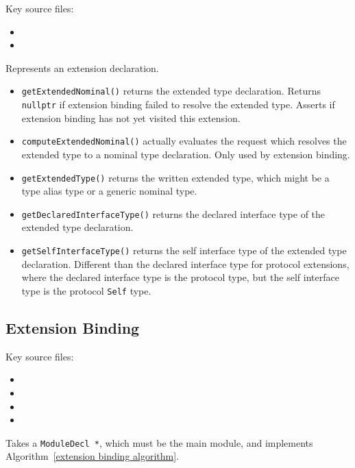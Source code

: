 \documentclass[../generics]{subfiles}
\begin{document}
Key source files:
\begin{itemize}
\item {}
\item {}
\end{itemize}

%
Represents an extension declaration.
\begin{itemize}
\item \texttt{getExtendedNominal()} returns the extended type declaration. Returns \verb|nullptr| if extension binding failed to resolve the extended type. Asserts if extension binding has not yet visited this extension.
\item \texttt{computeExtendedNominal()} actually evaluates the request which resolves the extended type to a nominal type declaration. Only used by extension binding.
\item \texttt{getExtendedType()} returns the written extended type, which might be a type alias type or a generic nominal type.
\item \texttt{getDeclaredInterfaceType()} returns the declared interface type of the extended type declaration.
\item \texttt{getSelfInterfaceType()} returns the self interface type of the extended type declaration. Different than the declared interface type for protocol extensions, where the declared interface type is the protocol type, but the self interface type is the protocol \texttt{Self} type.
\end{itemize}

\subsection*{Extension Binding}

Key source files:
\begin{itemize}
\item {}
\item {}
\item {}
\item {}
\end{itemize}

Takes a \texttt{ModuleDecl *}, which must be the main module, and implements Algorithm~\ref{extension binding algorithm}.
\end{document}
